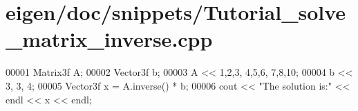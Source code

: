 \hypertarget{eigen_2doc_2snippets_2_tutorial__solve__matrix__inverse_8cpp_source}{}\section{eigen/doc/snippets/\+Tutorial\+\_\+solve\+\_\+matrix\+\_\+inverse.cpp}
\label{eigen_2doc_2snippets_2_tutorial__solve__matrix__inverse_8cpp_source}

\begin{DoxyCode}
00001 Matrix3f A;
00002 Vector3f b;
00003 A << 1,2,3,  4,5,6,  7,8,10;
00004 b << 3, 3, 4;
00005 Vector3f x = A.inverse() * b;
00006 cout << \textcolor{stringliteral}{"The solution is:"} << endl << x << endl;
\end{DoxyCode}
